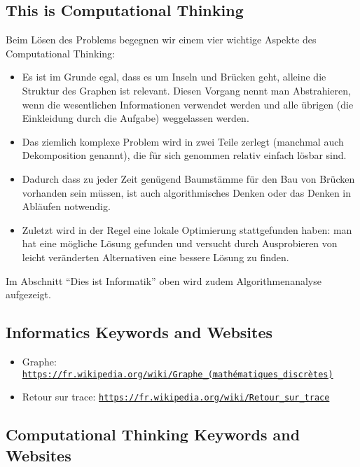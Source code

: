 \documentclass[a4paper,11pt]{report}
\newcommand{\BrochureUrlText}[1]{\texttt{#1}}
\begin{document}
\subsection*{This is Computational Thinking}

Beim Lösen des Problems begegnen wir einem vier wichtige Aspekte des Computational Thinking:

\begin{itemize}
  \item Es ist im Grunde egal, dass es um Inseln und Brücken geht, alleine die Struktur des Graphen ist relevant. Diesen Vorgang nennt man Abstrahieren, wenn die wesentlichen Informationen verwendet werden und alle übrigen (die Einkleidung durch die Aufgabe) weggelassen werden.
  \item Das ziemlich komplexe Problem wird in zwei Teile zerlegt (manchmal auch Dekomposition genannt), die für sich genommen relativ einfach lösbar sind.
  \item Dadurch dass zu jeder Zeit genügend Baumstämme für den Bau von Brücken vorhanden sein müssen, ist auch algorithmisches Denken oder das Denken in Abläufen notwendig.
  \item Zuletzt wird in der Regel eine lokale Optimierung stattgefunden haben: man hat eine mögliche Lösung gefunden und versucht durch Ausprobieren von leicht veränderten Alternativen eine bessere Lösung zu finden.
\end{itemize}

Im Abschnitt “Dies ist Informatik” oben wird zudem Algorithmenanalyse aufgezeigt.


\subsection*{Informatics Keywords and Websites}

\begin{itemize}
  \item Graphe: \href{https://fr.wikipedia.org/wiki/Graphe_(math\%C3\%A9matiques_discr\%C3\%A8tes)}{\BrochureUrlText{https://fr.wikipedia.org/wiki/Graphe\_(mathématiques\_discrètes)}}
  \item Retour sur trace: \href{https://fr.wikipedia.org/wiki/Retour_sur_trace}{\BrochureUrlText{https://fr.wikipedia.org/wiki/Retour\_sur\_trace}}
\end{itemize}


\subsection*{Computational Thinking Keywords and Websites}
\end{document}
